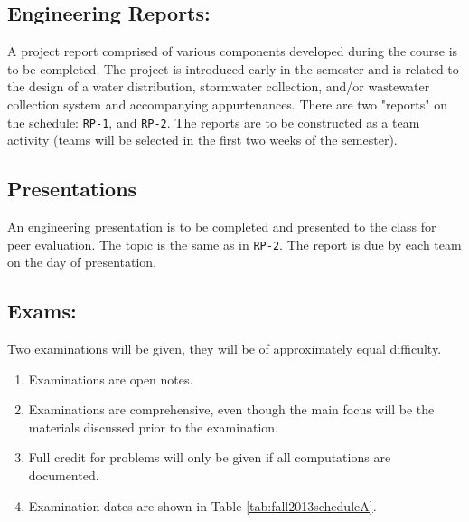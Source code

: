 \documentclass[12pt]{article}
\begin{document}
\subsection*{Engineering Reports:}  
A project report comprised of various components developed during the course is to be completed.  
The project is introduced early in the semester and is related to the design of a water distribution, stormwater collection, and/or wastewater collection system and accompanying appurtenances.    
There are two "reports" on the schedule: \texttt{RP-1}, and \texttt{RP-2}.  
The reports are to be constructed as a team activity (teams will be selected in the first two weeks of the semester).

\subsection*{Presentations}
An engineering presentation is to be completed and presented to the class for peer evaluation. 
The topic is the same as in \texttt{RP-2}.   The report is due by each team on the day of presentation.

\subsection*{Exams:} Two examinations will be given, they will be of approximately equal difficulty.
\begin{enumerate}
\item Examinations are open notes.
\item Examinations are comprehensive, even though the main focus will be the materials discussed prior to the examination.
\item Full credit for problems will only be given if all computations are documented.
\item Examination dates are shown in Table \ref{tab:fall2013scheduleA}.
\end{enumerate}
\end{document}
